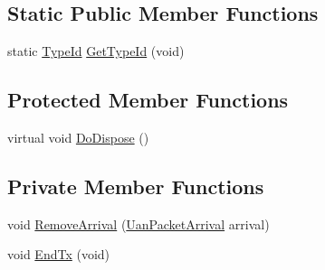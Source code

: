 \subsection*{Static Public Member Functions}
\begin{DoxyCompactItemize}
\item 
static \hyperlink{classns3_1_1TypeId}{Type\+Id} \hyperlink{classns3_1_1UanTransducerHd_ae159c3580488d03a5f84a4a3f111f69b}{Get\+Type\+Id} (void)
\end{DoxyCompactItemize}
\subsection*{Protected Member Functions}
\begin{DoxyCompactItemize}
\item 
virtual void \hyperlink{classns3_1_1UanTransducerHd_a3472ccf1218d8d5281a69e2a7c2135e2}{Do\+Dispose} ()
\end{DoxyCompactItemize}
\subsection*{Private Member Functions}
\begin{DoxyCompactItemize}
\item 
void \hyperlink{classns3_1_1UanTransducerHd_a8e3adc6fbd713988985d33060bc1f1fc}{Remove\+Arrival} (\hyperlink{classns3_1_1UanPacketArrival}{Uan\+Packet\+Arrival} arrival)
\item 
void \hyperlink{classns3_1_1UanTransducerHd_a0ee7ddf0c21ca8697612045a2b40e84f}{End\+Tx} (void)
\end{DoxyCompactItemize}
